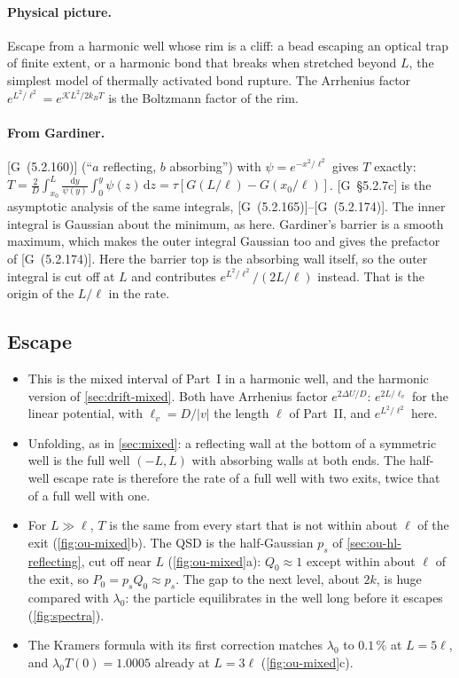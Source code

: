 \documentclass[11pt]{article}
\numberwithin{equation}{section}
\newcommand{\dd}{\mathrm{d}}
\newcommand{\G}[1]{[G~(#1)]}
\newcommand{\Gs}[1]{[G~\S#1]}
\begin{document}
\paragraph{Physical picture.} Escape from a harmonic well whose rim is a cliff: a bead escaping an optical
trap of finite extent, or a harmonic bond that breaks when stretched beyond $L$, the simplest model of thermally
activated bond rupture. The Arrhenius factor $e^{L^2/\ell^2}=e^{\mathcal KL^2/2k_BT}$ is the Boltzmann factor of the
rim.

\paragraph{From Gardiner.} \G{5.2.160} (``$a$ reflecting, $b$ absorbing'') with $\psi=e^{-x^2/\ell^2}$ gives
$T$ exactly: $T=\frac2D\int_{x_0}^L\frac{\dd y}{\psi(y)}\int_0^y\psi(z)\,\dd z=\tau[G(L/\ell)-G(x_0/\ell)]$.
\Gs{5.2.7c} is the asymptotic analysis of the same integrals, \G{5.2.165}--\G{5.2.174}. The inner integral is
Gaussian about the minimum, as here. Gardiner's barrier is a smooth maximum, which makes the outer integral
Gaussian too and gives the prefactor of \G{5.2.174}. Here the barrier top is the absorbing wall itself, so
the outer integral is cut off at $L$ and contributes $e^{L^2/\ell^2}/(2L/\ell)$ instead. That is the origin of
the $L/\ell$ in the rate.

\subsection{Escape}

\begin{itemize}
  \item This is the mixed interval of Part~I in a harmonic well, and the harmonic version of
        \cref{sec:drift-mixed}. Both have Arrhenius factor $e^{2\Delta U/D}$: $e^{2L/\ell_v}$ for the linear
        potential, with $\ell_v=D/|v|$ the length $\ell$ of Part~II, and $e^{L^2/\ell^2}$ here.
  \item Unfolding, as in \cref{sec:mixed}: a reflecting wall at the bottom of a symmetric well is the full
        well $(-L,L)$ with absorbing walls at both ends. The half-well escape rate is therefore the rate of a
        full well with two exits, twice that of a full well with one.
  \item For $L\gg\ell$, $T$ is the same from every start that is not within about $\ell$ of the exit
        (\cref{fig:ou-mixed}b). The QSD is the half-Gaussian $p_s$ of \cref{sec:ou-hl-reflecting}, cut off
        near $L$ (\cref{fig:ou-mixed}a): $Q_0\approx1$ except within about $\ell$ of the exit, so $P_0=p_sQ_0\approx p_s$. The gap to the next level, about $2k$, is huge compared with
        $\lambda_0$: the particle equilibrates in the well long before it escapes (\cref{fig:spectra}).
  \item The Kramers formula with its first correction matches $\lambda_0$ to $0.1\,\%$ at $L=5\ell$, and
        $\lambda_0T(0)=1.0005$ already at $L=3\ell$ (\cref{fig:ou-mixed}c).
\end{itemize}
\end{document}
